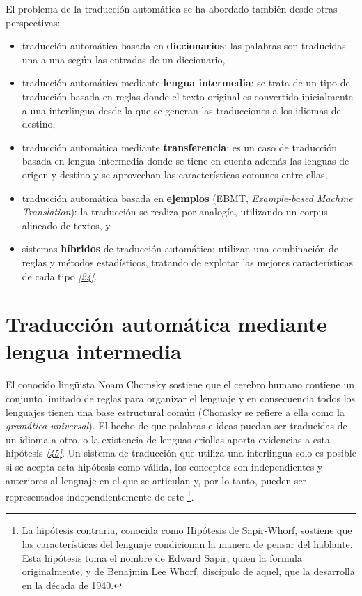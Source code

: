 \documentclass[a4paper,12pt,spanish]{book}
\begin{document}
El problema de la traducción automática se ha abordado también desde otras perspectivas:
\begin{itemize}
\item {} 
traducción automática basada en \textbf{diccionarios}: las palabras son traducidas
una a una según las entradas de un diccionario,

\item {} 
traducción automática mediante \textbf{lengua intermedia}: se trata de un tipo de traducción
basada en reglas donde el texto original es convertido inicialmente a una
interlingua desde la que se generan las traducciones a los idiomas de destino,

\item {} 
traducción automática mediante \textbf{transferencia}: es un caso de traducción basada en
lengua intermedia donde se tiene en cuenta además las lenguas de origen y destino y se
aprovechan las características comunes entre ellas,

\item {} 
traducción automática basada en \textbf{ejemplos} (EBMT, \emph{Example-based Machine Translation}):
la traducción se realiza por analogía, utilizando un corpus alineado de textos, y

\item {} 
sistemas \textbf{híbridos} de traducción automática: utilizan una combinación de reglas y
métodos estadísticos, tratando de explotar las mejores características de cada
tipo \label{0.intro:id22}{\hyperref[zreferences:costa-jussa2014]{\emph{{[}24{]}}}}.

\end{itemize}


\section{Traducción automática mediante lengua intermedia}
\label{0.intro:traduccion-automatica-mediante-lengua-intermedia}
El conocido lingüista Noam Chomsky sostiene que el cerebro humano contiene un
conjunto limitado de reglas para organizar el lenguaje y en consecuencia todos
los lenguajes tienen una base estructural común (Chomsky se refiere a ella como
la \emph{gramática universal}). El hecho de que palabras e ideas puedan ser traducidas
de un idioma a otro, o la existencia de lenguas criollas aporta evidencias a esta
hipótesis \label{0.intro:id23}{\hyperref[zreferences:kottak2002]{\emph{{[}45{]}}}}. Un sistema de traducción que utiliza una interlingua
solo es posible si se acepta esta hipótesis como válida, los conceptos son independientes
y anteriores al lenguaje en el que se articulan y, por lo tanto, pueden ser representados
independientemente de este \footnote{
La hipótesis contraria, conocida como Hipótesis de Sapir-Whorf, sostiene que
las características del lenguaje condicionan la manera de pensar del hablante. Esta
hipótesis toma el nombre de Edward Sapir, quien la formula originalmente, y de
Benajmin Lee Whorf, discípulo de aquel, que la desarrolla en la década de 1940.
}.
\end{document}
